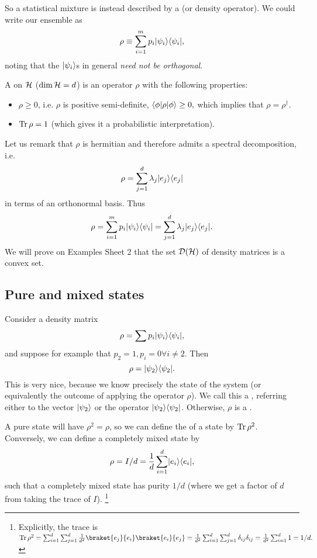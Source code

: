 So a statistical mixture is instead described by a  (or density operator). We could write our ensemble as
\begin{equation}
    \rho \equiv \sum_{i=1}^m p_i \lvert\psi_i\rangle \langle\psi_i\rvert,
\end{equation}
noting that the $\lvert\psi_i\rangle$s in general \emph{need not be orthogonal}.
\begin{defn}
    A  on $\mathcal H$ ($\dim \mathcal H = d$) is an operator $\rho$ with the following properties:
    \begin{itemize}
        \item $\rho \geq 0$, i.e. $\rho$ is positive semi-definite, $\langle\phi\rvert\rho \lvert\phi\rangle\geq 0,$ which implies that $\rho=\rho^\dagger$.
        \item $\operatorname{Tr} \rho =1$ (which gives it a probabilistic interpretation).
    \end{itemize}
\end{defn}
Let us remark that $\rho$ is hermitian and therefore admits a spectral decomposition, i.e.
\begin{equation}
    \rho = \sum_{j=1}^d \lambda_j \lvert e_j\rangle\langle e_j\rvert
\end{equation}
in terms of an orthonormal basis. Thus
\begin{equation}
    \rho=\sum_{i=1}^m p_i \lvert\psi_i\rangle\langle\psi_i\rvert = \sum_{j=1}^d \lambda_j \lvert e_j\rangle \langle e_j\rvert.
\end{equation}
We will prove on Examples Sheet 2 that the set
$\mathcal{D}(\mathcal H)$ of density matrices is a convex set.

\subsection*{Pure and mixed states} 
Consider a density matrix
\begin{equation}
    \rho = \sum p_i \lvert\psi_i\rangle\langle\psi_i\rvert,
\end{equation}
and suppose for example that $p_2=1, p_i=0 \forall i\neq 2$. Then
\begin{equation}
    \rho=\lvert\psi_2\rangle\langle\psi_2\rvert.
\end{equation}
This is very nice, because we know precisely the state of the system (or equivalently the outcome of applying the operator $\rho$). We call this a , referring either to the vector $\lvert\psi_2\rangle$ or the operator $\lvert\psi_2\rangle\langle\psi_2\rvert$. Otherwise, $\rho$ is a .

A pure state will have $\rho^2 = \rho$, so we can define the  of a state by $\operatorname{Tr} \rho^2$. Conversely, we can define a completely mixed state by
\begin{equation}
    \rho = I/d=\frac{1}{d} \sum_{i=1}^d \lvert e_i\rangle \langle e_i\rvert,
\end{equation}
such that a completely mixed state has purity $1/d$ (where we get a factor of $d$ from taking the trace of $I$).%
    \footnote{Explicitly, the trace is $\Tr \rho^2 = \sum_{i=1}^d \sum_{j=1}^d \frac{1}{d^2} \braket{e_j}{e_i}\braket{e_i}{e_j}=\frac{1}{d^2}\sum_{i=1}^d \sum_{j=1}^d \delta_{ij} \delta_{ij} = \frac{1}{d^2}\sum_{i=1}^d 1 = 1/d.$
    }

